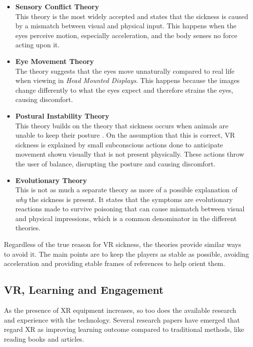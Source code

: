                 \begin{itemize}
                    \item \textbf{Sensory Conflict Theory} \\
                    This theory is the most widely accepted and states that the sickness is caused by a mismatch between visual and physical input. This happens when the eyes perceive motion, especially acceleration, and the body senses no force acting upon it.
                
                    \item \textbf{Eye Movement Theory} \\
                    The theory suggests that the eyes move unnaturally compared to real life when viewing in \emph{Head Mounted Displays}. This happens because the images change differently to what the eyes expect and therefore strains the eyes, causing discomfort.
                    
                    \item \textbf{Postural Instability Theory} \\
                    This theory builds on the theory that sickness occurs when animals are unable to keep their posture \cite{postural_instability}. On the assumption that this is correct, VR sickness is explained by small subconscious actions done to anticipate movement shown visually that is not present physically. These actions throw the user of balance, disrupting the posture and causing discomfort.
                    
                    \item \textbf{Evolutionary Theory} \\
                    This is not as much a separate theory as more of a possible explanation of \emph{why} the sickness is present. It states that the symptoms are evolutionary reactions made to survive poisoning that can cause mismatch between visual and physical impressions, which is a common denominator in the different theories.
                \end{itemize}
                
                Regardless of the true reason for VR sickness, the theories provide similar ways to avoid it. The main points are to keep the players as stable as possible, avoiding acceleration and providing stable frames of references to help orient them.
            
        \subsection{VR, Learning and Engagement}
            As the presence of XR equipment increases, so too does the available research and experience with the technology. Several research papers have emerged that regard XR as improving learning outcome compared to traditional methods, like reading books and articles.
            
